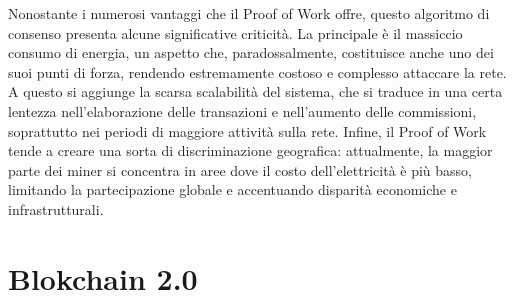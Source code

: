 Nonostante i numerosi vantaggi che il Proof of Work offre, questo algoritmo di consenso presenta alcune significative criticità. La principale è il massiccio consumo di energia, un aspetto che, paradossalmente, costituisce anche uno dei suoi punti di forza, rendendo estremamente costoso e complesso attaccare la rete.
A questo si aggiunge la scarsa scalabilità del sistema, che si traduce in una certa lentezza nell’elaborazione delle transazioni e nell’aumento delle commissioni, soprattutto nei periodi di maggiore attività sulla rete. Infine, il Proof of Work tende a creare una sorta di discriminazione geografica: attualmente, la maggior parte dei miner si concentra in aree dove il costo dell’elettricità è più basso, limitando la partecipazione globale e accentuando disparità economiche e infrastrutturali.

\section{Blokchain 2.0}


